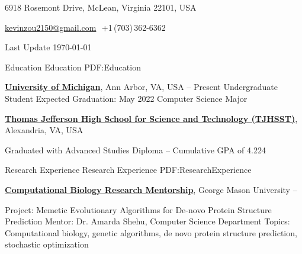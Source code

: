 \documentclass[letterpaper,MMMyyyy,nonstopmode]{style}
\newcommand{\CVAuthor}{Kevin Zou}
\newcommand{\CVNote}{Last Update \today}
\begin{document}

\Title{\CVAuthor}

\begin{SubTitle}
{6918 Rosemont Drive, McLean, Virginia 22101, USA}
\par
\href{mailto:kevinzou2150@gmail.com}{kevinzou2150@gmail.com}
\,\SubBulletSymbol\,+1\,(703)\,362-6362
\par
\CVNote
\end{SubTitle}

\begin{Body}


\Section
{Education}
{Education}
{PDF:Education}

\Entry
\href{https://www.umich.edu/}
{\textbf{University of Michigan}},
Ann Arbor, VA, USA
\hfill
{} -- Present
\Gap
\BulletItem
Undergraduate Student
\hfill
Expected Graduation: May 2022
\BulletItem
Computer Science Major
\Gap

\Entry
\href{https://tjhsst.fcps.edu/}
{\textbf{Thomas Jefferson High School for Science and Technology (TJHSST)}},
Alexandria, VA, USA

\Gap
\BulletItem
Graduated with Advanced Studies Diploma
\hfill
{} --
\BulletItem
Cumulative GPA of 4.224



\Section
{Research Experience}
{Research Experience}
{PDF:ResearchExperience}

\Entry
\href{http://cs.gmu.edu/~ashehu/}
{\textbf{Computational Biology Research Mentorship}},
George Mason University
\hfill
{} -- 

\Gap
\BulletItem
Project:
Memetic Evolutionary Algorithms for De-novo Protein Structure Prediction
\BulletItem
Mentor:
Dr. Amarda Shehu, Computer Science Department
\BulletItem
Topics:
Computational biology, genetic algorithms, de novo protein structure prediction, stochastic optimization

\begin{comment}
\Section
{Publications}
{Publications}
{PDF:Publications}

\SubSection
{Conferences}
{Conferences}
{PDF:Conferences}


\end{comment}
\end{Body}
\end{document}
